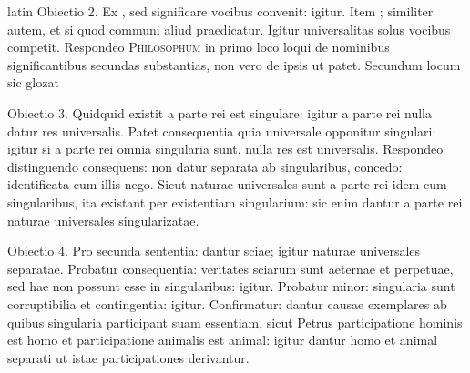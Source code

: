 \begin{otherlanguage*}{latin}
\pstart
Obiectio 2. Ex , sed significare vocibus convenit:
igitur. Item ; similiter autem, et si quod communi aliud praedicatur. Igitur universalitas solus vocibus competit. Respondeo \textsc{Philosophum} in primo loco loqui de nominibus significantibus secundas substantias, non vero de ipsis ut patet. Secundum locum sic glozat  
\pend

\pstart
Obiectio 3. Quidquid existit a parte rei est singulare:
igitur a parte rei nulla datur res universalis. Patet consequentia quia universale opponitur singulari:
igitur si a parte rei omnia singularia sunt, nulla res est universalis. Respondeo distinguendo consequens:
non datur separata ab singularibus, concedo:
identificata cum illis nego. Sicut naturae universales sunt a parte rei idem cum singularibus, ita existant per existentiam singularium:
sic enim dantur a parte rei naturae universales singularizatae. 
\pend

\pstart
Obiectio 4. Pro secunda sententia:
dantur sciae; igitur naturae universales separatae. Probatur consequentia:
veritates sciarum sunt aeternae et perpetuae, sed hae non possunt esse in singularibus:
igitur. Probatur minor:
singularia sunt corruptibilia et contingentia:
igitur. Confirmatur:
dantur causae exemplares ab quibus singularia participant suam essentiam, sicut Petrus participatione hominis est homo et participatione animalis est animal:
igitur dantur homo et animal separati ut istae participationes derivantur. 
\pend


\end{otherlanguage*}
